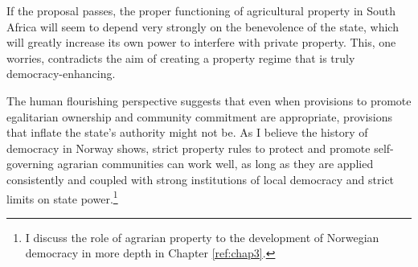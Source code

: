 If the proposal passes, the proper functioning of agricultural property in South Africa will seem to depend very strongly on the benevolence of the state, which will greatly increase its own power to interfere with private property. This, one worries, contradicts the aim of creating a property regime that is truly democracy-enhancing.

The human flourishing perspective suggests that even when provisions to promote egalitarian ownership and community commitment are appropriate, provisions that inflate the state's authority might not be. As I believe the history of democracy in Norway shows, strict property rules to protect and promote self-governing agrarian communities can work well, as long as they are applied consistently and coupled with strong institutions of local democracy and strict limits on state power.\footnote{I discuss the role of agrarian property to the development of Norwegian democracy in more depth in Chapter \ref{ref:chap3}.}

